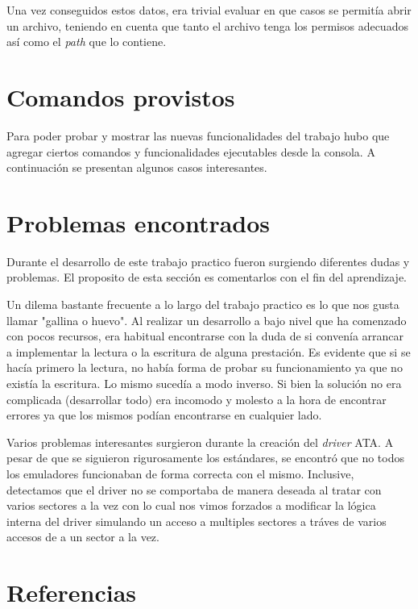 \documentclass[a4paper,10pt]{article}
\begin{document}
    Una vez conseguidos estos datos, era trivial evaluar en que casos se permitía abrir un archivo, teniendo en cuenta
    que tanto el archivo tenga los permisos adecuados así como el \textit{path} que lo contiene.

\newpage
\section{Comandos provistos}
    Para poder probar y mostrar las nuevas funcionalidades del trabajo hubo que agregar ciertos comandos y
    funcionalidades ejecutables desde la consola. A continuación se presentan algunos casos interesantes.

\newpage
\section{Problemas encontrados}

Durante el desarrollo de este trabajo practico fueron surgiendo diferentes dudas y problemas. El proposito de esta
sección es comentarlos con el fin del aprendizaje.

Un dilema bastante frecuente a lo largo del trabajo practico es lo que nos gusta llamar "gallina o huevo". Al realizar
un desarrollo a bajo nivel que ha comenzado con pocos recursos, era habitual encontrarse con la duda de si convenía
arrancar a implementar la lectura o la escritura de alguna prestación. Es evidente que si se hacía primero la lectura, 
no había forma de probar su funcionamiento ya que no existía la escritura. Lo mismo sucedía a modo inverso. Si bien 
la solución no era complicada (desarrollar todo) era incomodo y molesto a la hora de encontrar errores ya que los mismos
podían encontrarse en cualquier lado.

Varios problemas interesantes surgieron durante la creación del \textit{driver} ATA. A pesar de que se siguieron
rigurosamente los estándares, se encontró que no todos los emuladores funcionaban de forma correcta con el mismo.
Inclusive, detectamos que el driver no se comportaba de manera deseada al tratar con varios sectores a la vez con lo
cual nos vimos forzados a modificar la lógica interna del driver simulando un acceso a multiples sectores a tráves de
varios accesos de a un sector a la vez.

\newpage     
\section{Referencias}
\end{document}
